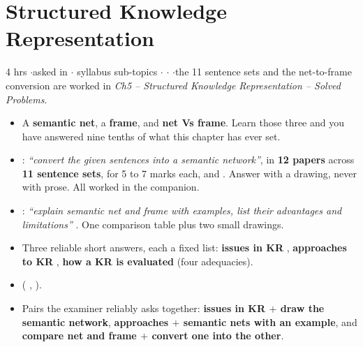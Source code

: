 \section{Structured Knowledge Representation}

{\color{sub}\footnotesize 4 hrs \gap$\cdot$\gap asked in 
\gap$\cdot$ syllabus sub-topics \gap$\cdot$\gap {} \gap$\cdot$\gap {} \gap$\cdot$\gap the 11 sentence sets and the net-to-frame conversion are worked
in \emph{Ch5 -- Structured Knowledge Representation -- Solved Problems}.}

\begin{itemize}
  \item {} A
        \textbf{semantic net}, a \textbf{frame}, and \textbf{net Vs frame}. Learn those
        three and you have answered nine tenths of what this chapter has ever set.
  \item {}:
        \emph{``convert the given sentences into a semantic network''}, in
        \textbf{12 papers} across \textbf{11 sentence sets}, for 5 to 7 marks each, and
        . Answer with a drawing, never with prose. All worked in the companion.
  \item {}:
        \emph{``explain semantic net and frame with examples, list their advantages and
        limitations''} . One comparison table plus two small drawings.
  \item Three reliable short answers, each a fixed list: \textbf{issues in KR} ,
        \textbf{approaches to KR} , \textbf{how a KR is evaluated} (four adequacies).
  \item {} ( ,  ).
  \item Pairs the examiner reliably asks together: \textbf{issues in KR $+$ draw the
        semantic network}, \textbf{approaches $+$ semantic nets with an example}, and
        \textbf{compare net and frame $+$ convert one into the other}.
\end{itemize}

